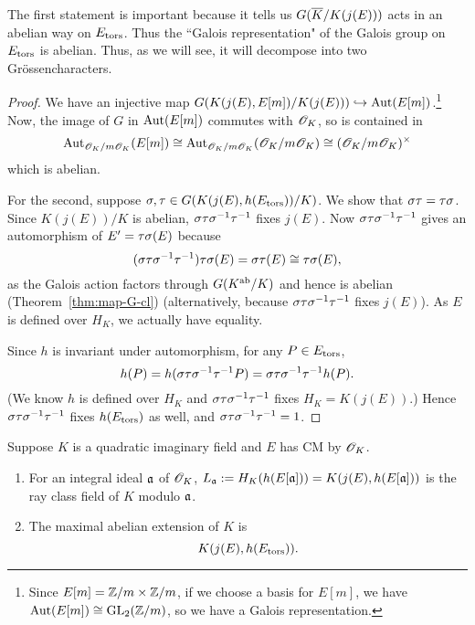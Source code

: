The first statement is important because it tells us $G(\overline{K}/K(j(E)))$ acts in an abelian way on $E_{\text{tors}}$. Thus the ``Galois representation" of the Galois group on $E_{\text{tors}}$ is abelian. Thus, as we will see, it will decompose into two Gr\"ossencharacters.
\begin{proof}
We have an injective map $G(K(j(E),E[m])/K(j(E)))\hookrightarrow \operatorname{Aut}(E[m])$.\footnote{Since $E[m]=\mathbb{Z}/m\times \mathbb{Z}/m$, if we choose a basis for $E[m]$, we have $\operatorname{Aut}(E[m])\cong \operatorname{GL}_2(\mathbb{Z}/m)$, so we have a Galois representation.} Now, the image of $G$ in $\operatorname{Aut}(E[m])$ commutes with $\mathscr{O}_K$, so is contained in 
\[\operatorname{Aut}_{\mathscr{O}_K/m\mathscr{O}_K}(E[m])\cong \operatorname{Aut}_{\mathscr{O}_K/m\mathscr{O}_K}(\mathscr{O}_K/m\mathscr{O}_K)\cong (\mathscr{O}_K/m\mathscr{O}_K)^{\times}
\]
which is abelian.

For the second, suppose $\sigma,\tau\in G(K(j(E),h(E_{\text{tors}}))/K)$. We show that $\sigma\tau=\tau\sigma$. Since $K(j(E))/K$ is abelian, $\sigma\tau\sigma^{-1}\tau^{-1}$ fixes $j(E)$. %
Now 
$\sigma\tau\sigma^{-1}\tau^{-1}$ gives an automorphism of $E'=\tau\sigma(E)$ because 
\[(\sigma\tau\sigma^{-1}\tau^{-1})\tau\sigma(E)=\sigma\tau(E)\cong \tau\sigma(E),\]
as the Galois action factors through $G(K^{\text{ab}}/K)$ and hence is abelian (Theorem~\ref{thm:map-G-cl}) (alternatively, because $\sigma\tau\sigma^{-1}\tau^{-1}$ fixes $j(E)$). As $E$ is defined over $H_K$, we actually have equality.

Since $h$ is invariant under automorphism, for any $P\in E_{\text{tors}}$,
\[
h(P)=h(\sigma\tau\sigma^{-1}\tau^{-1} P)=\sigma\tau\sigma^{-1}\tau^{-1} h(P).
\]
(We know $h$ is defined over $H_K$ and $\sigma\tau\sigma^{-1}\tau^{-1}$ fixes $H_K=K(j(E))$.) Hence $\sigma\tau\sigma^{-1}\tau^{-1}$ fixes $h(E_{\text{tors}})$ as well, and $\sigma\tau\sigma^{-1}\tau^{-1}=1$.
\end{proof}
\begin{thm}
Suppose $K$ is a quadratic imaginary field and $E$ has CM by $\mathscr{O}_K$.
\begin{enumerate}
\item
For an integral ideal $\mathfrak{a}$ of $\mathscr{O}_K$, $L_{\mathfrak{a}}:=H_K(h(E[\mathfrak{a}]))=K(j(E),h(E[\mathfrak{a}]))$ is the ray class field of $K$ modulo $\mathfrak{a}$. 
\item
The maximal abelian extension of $K$ is
\[
K(j(E),h(E_{\text{tors}})).
\]
\end{enumerate}
\end{thm}
